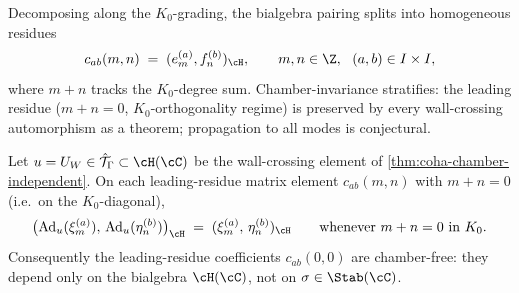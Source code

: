 Decomposing along the $K_0$-grading, the bialgebra pairing splits into
homogeneous residues
\[
 c_{ab}(m, n) \;=\; (e^{(a)}_m, f^{(b)}_n)_\cH,
 \qquad
 m, n \in \Z, \ \ (a, b) \in I \times I,
\]
where $m+n$ tracks the $K_0$-degree sum. Chamber-invariance stratifies:
the leading residue ($m+n=0$, $K_0$-orthogonality regime) is preserved
by every wall-crossing automorphism as a theorem; propagation to all
modes is conjectural.

\begin{theorem}
 \label{thm:hopf-pairing-chamber-invariance}
 Let $u = U_W \in \hat{\mathcal{T}}_\Gamma \subset \cH(\cC)$ be the wall-crossing
 element of \cref{thm:coha-chamber-independent}. On each leading-residue
 matrix element $c_{ab}(m, n)$ with $m + n = 0$ (i.e.\ on the $K_0$-diagonal),
 \[
 \big(\mathrm{Ad}_u(\xi_{m}^{(a)}),\, \mathrm{Ad}_u(\eta_{n}^{(b)})\big)_\cH
 \;=\; (\xi_{m}^{(a)},\, \eta_{n}^{(b)})_\cH
 \qquad \text{whenever } m + n = 0 \text{ in } K_0.
 \]
 Consequently the leading-residue coefficients $c_{ab}(0, 0)$ are
 chamber-free: they depend only on the bialgebra $\cH(\cC)$, not on
 $\sigma \in \Stab(\cC)$.
\end{theorem}

